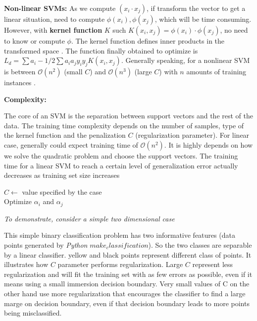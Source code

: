 \documentclass[catalog.tex]{subfiles}
\begin{document}
\textbf{Non-linear SVMs:} As we compute $ (x_i \cdot x_j)$, if transform the vector to get a linear situation, need to compute $\phi (x_i),\phi (x_j) $, which will be time consuming. However, with
\textbf{kernel function} $K$ such $K(x_i, x_j) = \phi (x_i)\cdot \phi (x_j) $, no need to know or compute $\phi$. The kernel function defines inner products in the transformed space \cite{slides}. The function finally obtained to optimize is $L_d=\sum a_i - 1/2 \sum a_i a_j y_i y_j K(x_i, x_j)$. Generally speaking, for a nonlinear SVM is between $\mathcal{O}(n^2)$ (small $C$) and $\mathcal{O}(n^3)$ (large $C$) with $n$ amounts of training instances \cite{paper1}.  


\textbf{Complexity:}

The core of an SVM is the separation between support vectors and the rest of the data. The training time complexity depends on the number of samples, type of the kernel function and the penalization $C$ (regularization parameter). For linear case, generally could expect training time of $\mathcal{O}(n^2)$. It is highly depends on how we solve the quadratic problem and choose the support vectors. The training time for a linear SVM to reach a certain level of generalization error actually decreases as training set size increases
\begin{Algorithm}[Training an SVM\label{alg:\currfilebase}]
	\BlankLine
	$C \leftarrow$ value specified by the case \\
	 {
 {
	Optimize $\alpha_i$ and $\alpha_j$ \\
}	
	}


\end{Algorithm}

\textit{To demonstrate, consider a simple two dimensional case}

This simple binary classification problem has two informative features (data points generated by \textit{Python} $make_classification$). So the two classes are separable by a linear classifier. yellow and black points represent different class of points. It illustrates how $C$ parameter performs regularization. Large $C$ represent less regularization and will fit the training set with as few errors as possible, even if it means using a small immersion decision boundary. Very small values of C on the other hand use more regularization that encourages the classifier to find a large marge on decision boundary, even if that decision boundary leads to more points being misclassified. 
\end{document}
